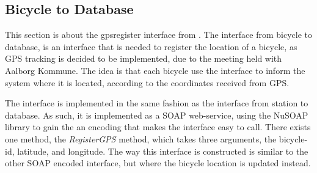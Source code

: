 \subsection{Bicycle to Database}
This section is about the gpsregister interface from .
The interface from bicycle to database, is an interface that is needed to register the location of a bicycle, as GPS tracking is decided to be implemented, due to the meeting held with Aalborg Kommune.
The idea is that each bicycle use the interface to inform the system where it is located, according to the coordinates received from GPS.

The interface is implemented in the same fashion as the interface from station to database.
As such, it is implemented as a SOAP web-service, using the NuSOAP library to gain the an encoding that makes the interface easy to call.
There exists one method, the \textit{RegisterGPS} method, which takes three arguments, the bicycle-id, latitude, and longitude.
The way this interface is constructed is similar to the other SOAP encoded interface, but where the bicycle location is updated instead.